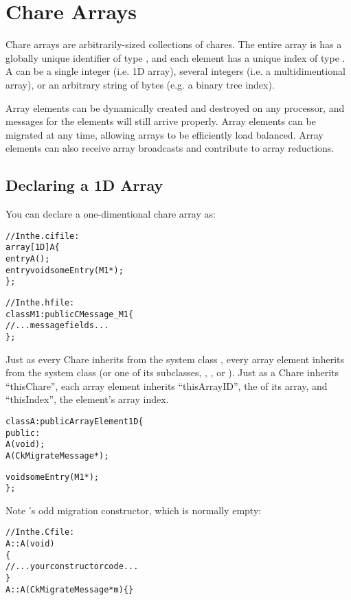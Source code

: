 \section{Chare Arrays}

Chare arrays  are arbitrarily-sized collections of chares.  The
entire array is has a globally unique identifier of type , and
each element has a unique index of type .  A 
can be a single integer (i.e. 1D array), several integers (i.e. a
multidimentional array), or an arbitrary string of bytes (e.g. a binary tree
index).

Array elements can be dynamically created and destroyed on any processor,
and messages for the elements will still arrive properly.
Array elements can be migrated at any time, allowing arrays to be efficiently
load balanced.  Array elements can also receive array broadcasts and
contribute to array reductions.

\subsection{Declaring a 1D Array}

You can declare a one-dimentional chare array
as:

\begin{alltt}
//In the .ci file:
array [1D] A \{
  entry A();
  entry void someEntry(M1 *);
\};

//In the .h file:
class M1:public CMessage_M1 \{
//...message fields...
\};
\end{alltt}

Just as every Chare inherits from the system class , every 
array element inherits from the system class  (or one
of its subclasses, , , or 
). Just as a Chare inherits ``thisChare'', each
array element inherits ``thisArrayID'', the  of its array,
and ``thisIndex'', the element's array index.

\begin{alltt}
class A : public ArrayElement1D \{
  public:
    A(void);
    A(CkMigrateMessage *);

    void someEntry(M1 *);
\};
\end{alltt}

Note 's odd migration constructor, which is normally empty:

\begin{alltt}
//In the .C file:
A::A(void)
\{
  //...your constructor code...
\}
A::A(CkMigrateMessage *m) \{ \}
\end{alltt}

